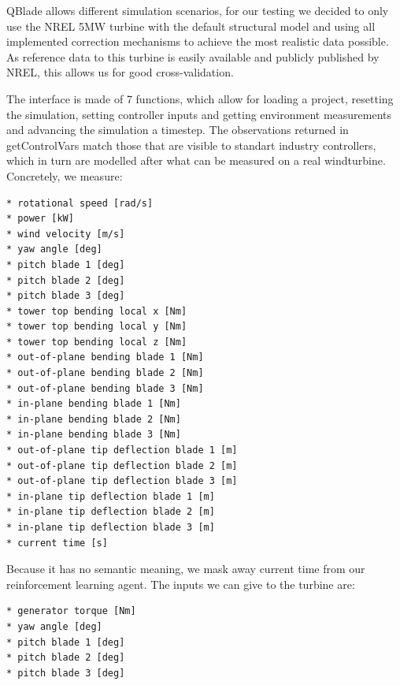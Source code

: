 \documentclass[hyperref,german,beleg]{cgvpub}
\begin{document}
QBlade allows different simulation scenarios, for our testing we decided to only use the NREL 5MW \cite{jonkmanDefinition5MWReference2009} turbine with the default structural model and using all implemented correction mechanisms to achieve the most realistic data possible. As reference data to this turbine is easily available and publicly published by NREL, this allows us for good cross-validation.

The interface is made of 7 functions, which allow for loading a project, resetting the simulation, setting controller inputs and getting environment measurements and advancing the simulation a timestep. The observations returned in getControlVars match those that are visible to standart industry controllers, which in turn are modelled after what can be measured on a real windturbine. Concretely, we measure:
\begin{verbatim}
* rotational speed [rad/s]
* power [kW]
* wind velocity [m/s]
* yaw angle [deg]
* pitch blade 1 [deg]
* pitch blade 2 [deg]
* pitch blade 3 [deg]
* tower top bending local x [Nm]
* tower top bending local y [Nm]
* tower top bending local z [Nm]
* out-of-plane bending blade 1 [Nm]
* out-of-plane bending blade 2 [Nm]
* out-of-plane bending blade 3 [Nm]
* in-plane bending blade 1 [Nm]
* in-plane bending blade 2 [Nm]
* in-plane bending blade 3 [Nm]
* out-of-plane tip deflection blade 1 [m]
* out-of-plane tip deflection blade 2 [m]
* out-of-plane tip deflection blade 3 [m]
* in-plane tip deflection blade 1 [m]
* in-plane tip deflection blade 2 [m]
* in-plane tip deflection blade 3 [m]
* current time [s]
\end{verbatim}

Because it has no semantic meaning, we mask away current time from our reinforcement learning agent. The inputs we can give to the turbine are:
\begin{verbatim}
* generator torque [Nm]
* yaw angle [deg]
* pitch blade 1 [deg]
* pitch blade 2 [deg]
* pitch blade 3 [deg]
\end{verbatim}
\end{document}

